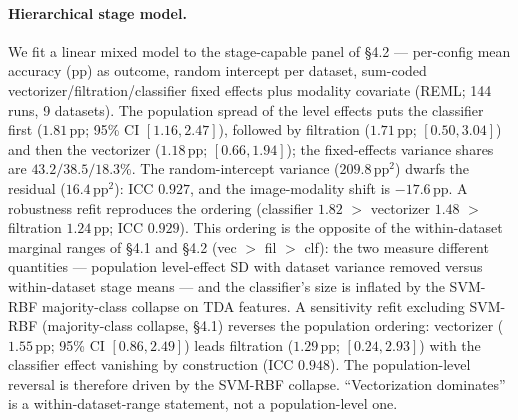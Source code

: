 \documentclass[12pt, a4paper]{report}
\theoremstyle{definition}
\theoremstyle{plain}
\theoremstyle{remark}
\begin{document}
\paragraph{Hierarchical stage model.} We fit a linear
mixed model to the stage-capable panel of \S4.2 --- per-config mean
accuracy (pp) as outcome, random intercept per dataset, sum-coded
vectorizer/filtration/classifier fixed effects plus modality covariate
(REML; 144 runs, 9 datasets). The population spread of the level
effects puts the classifier first ($1.81$\,pp; 95\% CI
$[1.16, 2.47]$), followed by filtration ($1.71$\,pp; $[0.50, 3.04]$)
and then the vectorizer ($1.18$\,pp; $[0.66, 1.94]$); the fixed-effects variance
shares are $43.2/38.5/18.3$\%. The random-intercept variance
($209.8$\,pp$^2$) dwarfs the
residual ($16.4$\,pp$^2$): ICC $0.927$,
and the image-modality shift is $-17.6$\,pp. A robustness
refit reproduces the ordering (classifier $1.82$ $>$ vectorizer $1.48$ $>$
filtration $1.24$\,pp; ICC $0.929$). This ordering is the opposite of
the within-dataset marginal ranges of \S4.1 and \S4.2 (vec $>$ fil $>$
clf): the two measure different quantities --- population level-effect
SD with dataset variance removed versus within-dataset stage means ---
and the classifier's size is inflated by the SVM-RBF majority-class
collapse on TDA features. A sensitivity refit excluding SVM-RBF
(majority-class collapse, \S4.1) reverses the
population ordering: vectorizer ($1.55$\,pp; 95\% CI $[0.86, 2.49]$)
leads filtration ($1.29$\,pp; $[0.24, 2.93]$) with the classifier
effect vanishing by construction (ICC $0.948$). The population-level
reversal is therefore driven by the SVM-RBF collapse.
``Vectorization dominates'' is a
within-dataset-range statement, not a population-level one.
\end{document}
